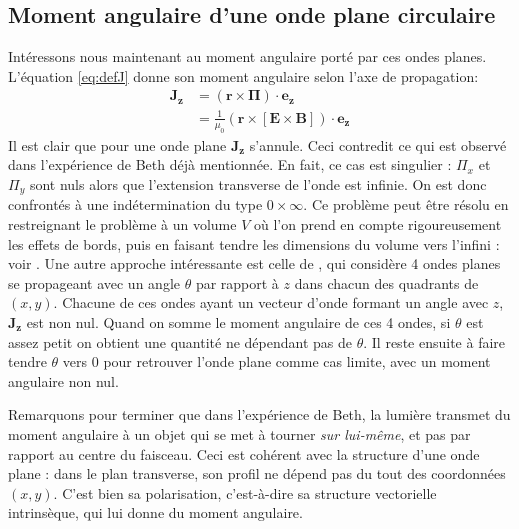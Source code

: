 \subsection{Moment angulaire d'une onde plane circulaire}
\label{sec:ma_circ}
Intéressons nous maintenant au moment angulaire porté par ces ondes planes. L'équation \ref{eq:defJ} donne son moment angulaire selon l'axe de propagation: 
\begin{align}
\bm{J_z}&=(\bm{r}\times\bm{\Pi})\cdot\bm{e_z}\\
&=\frac{1}{\mu_0}(\bm{r}\times[\bm{E}\times\bm{B}])\cdot\bm{e_z}
\end{align}
Il est clair que pour une onde plane $\bm{J_z}$ s'annule. Ceci contredit ce qui est observé dans l'expérience de Beth  déjà mentionnée. En fait, ce cas est singulier : $\Pi_x$ et $\Pi_y $ sont nuls alors que l'extension transverse de l'onde est infinie. On est donc confrontés à une indétermination du type $0\times \infty$. 
Ce problème peut être résolu en restreignant le problème à un volume $V$ où l'on prend en compte rigoureusement les effets de bords, puis en faisant tendre les dimensions du volume vers l'infini : voir . Une autre approche intéressante est celle de , qui considère 4 ondes planes se propageant avec un angle $\theta$ par rapport à $z$ dans chacun des quadrants de $(x,y)$. Chacune de ces ondes ayant un vecteur d'onde formant un angle avec $z$, $\bm{J_z}$ est non nul. Quand on somme le moment angulaire de ces 4 ondes, si $\theta$ est assez petit on obtient une quantité ne dépendant pas de $\theta$. Il reste ensuite à faire tendre $\theta$ vers 0 pour retrouver l'onde plane comme cas limite, avec un moment angulaire non nul.

Remarquons pour terminer que dans l'expérience de Beth, la lumière transmet du moment angulaire à un objet qui se met à tourner \textit{sur lui-même}, et pas par rapport au centre du faisceau. Ceci est cohérent avec la structure d'une onde plane : dans le plan transverse, son profil ne dépend pas du tout des coordonnées $(x,y)$. C'est bien sa polarisation, c'est-à-dire sa structure vectorielle intrinsèque, qui lui donne du moment angulaire. 

